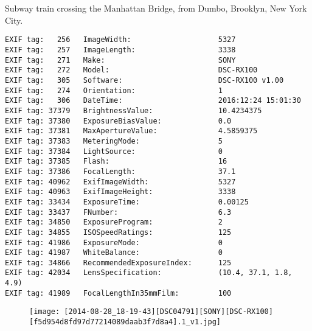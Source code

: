 \section{\protect{}}
\noindent Subway train crossing the Manhattan Bridge, from Dumbo, Brooklyn, New York City.
\noindent
\begin{lstlisting}
EXIF tag:   256   ImageWidth:                    5327
EXIF tag:   257   ImageLength:                   3338
EXIF tag:   271   Make:                          SONY
EXIF tag:   272   Model:                         DSC-RX100
EXIF tag:   305   Software:                      DSC-RX100 v1.00
EXIF tag:   274   Orientation:                   1
EXIF tag:   306   DateTime:                      2016:12:24 15:01:30
EXIF tag: 37379   BrightnessValue:               10.4234375
EXIF tag: 37380   ExposureBiasValue:             0.0
EXIF tag: 37381   MaxApertureValue:              4.5859375
EXIF tag: 37383   MeteringMode:                  5
EXIF tag: 37384   LightSource:                   0
EXIF tag: 37385   Flash:                         16
EXIF tag: 37386   FocalLength:                   37.1
EXIF tag: 40962   ExifImageWidth:                5327
EXIF tag: 40963   ExifImageHeight:               3338
EXIF tag: 33434   ExposureTime:                  0.00125
EXIF tag: 33437   FNumber:                       6.3
EXIF tag: 34850   ExposureProgram:               2
EXIF tag: 34855   ISOSpeedRatings:               125
EXIF tag: 41986   ExposureMode:                  0
EXIF tag: 41987   WhiteBalance:                  0
EXIF tag: 34866   RecommendedExposureIndex:      125
EXIF tag: 42034   LensSpecification:             (10.4, 37.1, 1.8, 4.9)
EXIF tag: 41989   FocalLengthIn35mmFilm:         100

\end{lstlisting}
\clearpage
\begin{figure}
\raggedleft
\texttt{[image: [2014-08-28\_18-19-43][DSC04791][SONY][DSC-RX100][f5d954d8fd97d77214089daab3f7d8a4].1\_v1.jpg]}
\end{figure}


\clearpage
